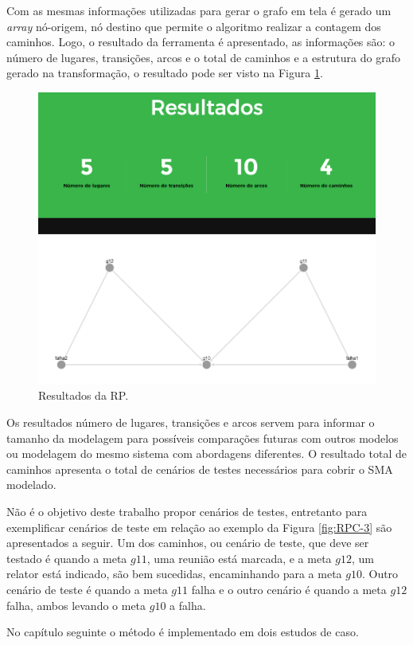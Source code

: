 Com as mesmas informações utilizadas para gerar o grafo em tela é gerado um \textit{array} nó-origem, nó destino que permite o algoritmo realizar a contagem dos caminhos. Logo, o resultado da ferramenta é apresentado, as informações são: o número de lugares, transições, arcos e o total de caminhos e a estrutura do grafo gerado na transformação, o resultado pode ser visto na Figura \ref{fig:4-resultado}.

\begin{figure}[ht]
\centering
\includegraphics[scale=0.3]{imagens/4-resultado.png}
\caption{Resultados da RP.}
\label{fig:4-resultado}
\end{figure}

Os resultados número de lugares, transições e arcos servem para informar o tamanho da modelagem para possíveis comparações futuras com outros modelos ou modelagem do mesmo sistema com abordagens diferentes. O resultado total de caminhos apresenta o total de cenários de testes necessários para cobrir o SMA modelado.

Não é o objetivo deste trabalho propor cenários de testes, entretanto para exemplificar cenários de teste em relação ao exemplo da Figura \ref{fig:RPC-3} são apresentados a seguir. Um dos caminhos, ou cenário de teste, que deve ser testado é quando a meta $g11$, uma reunião está marcada, e a meta $g12$, um relator está indicado, são bem sucedidas, encaminhando para a meta $g10$. Outro cenário de teste é quando a meta $g11$ falha e o outro cenário é quando a meta $g12$ falha, ambos levando o meta $g10$ a falha.

No capítulo seguinte o método é implementado em dois estudos de caso. 